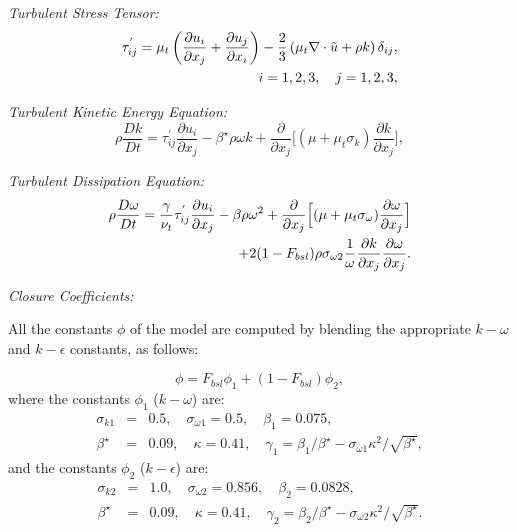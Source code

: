{\it Turbulent Stress Tensor:}
\begin{equation}
\begin{split}
\tau_{ij}^{'}=\mu_t \left(\frac{\partial u_i}{\partial x_j}+\frac
{\partial u_j}{\partial x_i}\right) - \frac{2}{3} \left(\mu_t \nabla \cdot \Tilde{u} + \rho k\right) \delta_{ij}, \\
 i=1,2,3, \quad j=1,2,3,
\end{split}
\end{equation}


{\it Turbulent Kinetic Energy Equation:}
\begin{equation}
\rho \frac{D k}{Dt} = \tau_{ij}^{'}\frac{\partial u_i}
{\partial x_j}-\beta^{\star}\rho\omega k + \frac{\partial}{\partial
 x_{j}} \bigl[(\mu+\mu_t \sigma_k)
\frac{\partial k}{\partial x_j} \Bigr] ,
\label{kb-turb}
\end{equation}

{\it Turbulent Dissipation Equation:}
\begin{equation}
\begin{split}
\rho \frac{D \omega}{D t} = \frac{\gamma}{\nu_{t}}\tau_{ij}^{'}\frac{\partial u_i}
{\partial x_j} - \beta \rho \omega^{2} +
\frac{\partial}{\partial x_j} \Bigl[ (\mu+\mu_t \sigma_{\omega})
\frac{\partial \omega}{\partial x_j} \Bigr] \\
+2(1-F_{bsl})\rho \sigma_{\omega 2} \frac{1}{\omega} \frac{\partial k}
{\partial x_{j}} \frac{\partial \omega}{\partial x_{j}}.
\end{split}
\label{omega-turb}
\end{equation}

{\it Closure Coefficients:}

All the constants $\phi$ of the model are computed by blending the
appropriate $k-\omega$ and $k-\epsilon$ constants, as follows:

\begin{equation}
\phi = F_{bsl} \phi_{1} + (1-F_{bsl}) \phi_2,
\label{constant}
\end{equation}
where the constants $\phi_1$ ($k-\omega$) are:
\begin{eqnarray}
\nonumber
\sigma_{k1} &=& 0.5, \quad \sigma_{\omega 1} = 0.5,
\quad \beta_1 = 0.075,\\
 \beta^{\star} &=& 0.09, \quad \kappa = 0.41,
\quad \gamma_1 = \beta_1/\beta^{\star} - \sigma_{\omega 1} \kappa^{2}/\sqrt
{\beta^{\star}},
\end{eqnarray}
and the constants $\phi_2$ ($k-\epsilon$) are:
\begin{eqnarray}
\nonumber
\sigma_{k2} &=& 1.0, \quad \sigma_{\omega 2} = 0.856,
\quad \beta_2 = 0.0828,\\
 \beta^{\star} &=& 0.09, \quad \kappa = 0.41,
\quad \gamma_2 = \beta_2/\beta^{\star} - \sigma_{\omega 2} \kappa^{2}/\sqrt
{\beta^{\star}}.
\end{eqnarray}

